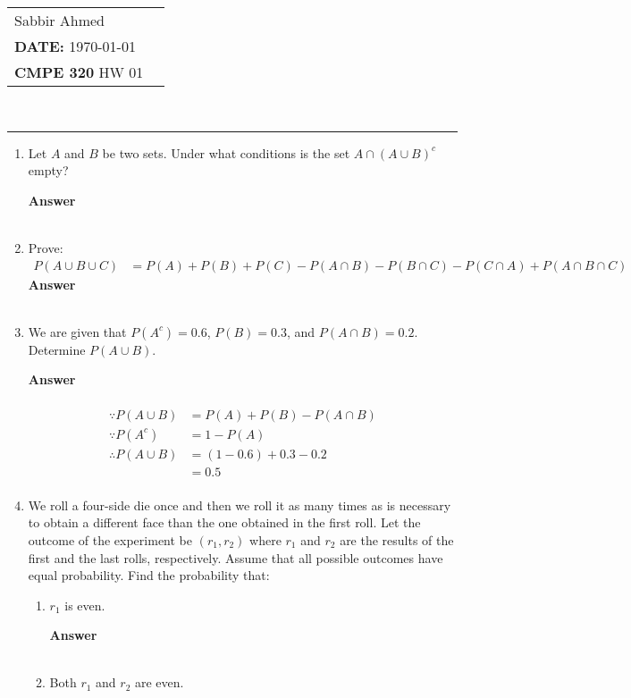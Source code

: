 \documentclass[paper=usletter, fontsize=12pt]{article}
\newcommand{\documentinfo}[5]{
    \begin{centering}
        \parbox{2in}{
        \begin{spacing}{1}
            \begin{flushleft}
                \begin{tabular}{l l}
                    #1 \\
                    #2 \\
                    #3 \\
                \end{tabular}\\
                \rule{\textwidth}{1pt}
            \end{flushleft}
        \end{spacing}
        }
    \end{centering}
}
\newcommand{\ans}{\textbf{Answer} \\ \ }
\begin{document}
    \documentinfo{Sabbir Ahmed}{\textbf{DATE:} \today}{\textbf{CMPE 320} HW 01}
    \vspace{-0.2in}

    \begin{enumerate}

        \item Let $A$ and $B$ be two sets. Under what conditions is the set $A
        \cap (A \cup B)^c$ empty?

        \ans

        \item Prove:
            \begin{align*}
                P(A \cup B \cup C) & = P(A) + P(B) + P(C) - P(A \cap B) - P(B
                \cap C) - P(C \cap A) + P(A \cap B \cap C)
            \end{align*}
        \ans

        \item We are given that $P(A^c) = 0.6$, $P(B) = 0.3$, and $P(A \cap B)
        = 0.2$. Determine $P(A \cup B)$.

        \ans
        \vspace{-0.4in}
        \begin{align*}
            \because P(A \cup B) & = P(A) + P(B) - P(A \cap B) \\
            \because P(A^c) & = 1 - P(A) \\
            \therefore P(A \cup B) & = (1 - 0.6) + 0.3 - 0.2 \\
            & = 0.5 \\
        \end{align*}

        \vspace{-0.4in}
        \item We roll a four-side die once and then we roll it as many times as
        is necessary to obtain a different face than the one obtained in the
        first roll. Let the outcome of the experiment be $(r_1, r_2)$ where
        $r_1$ and $r_2$ are the results of the first and the last rolls,
        respectively. Assume that all possible outcomes have equal probability.
        Find the probability that:

            \begin{enumerate}

                \item $r_1$ is even.

                \ans

                \item Both $r_1$ and $r_2$ are even.


\end{enumerate}
\end{enumerate}
\end{document}

